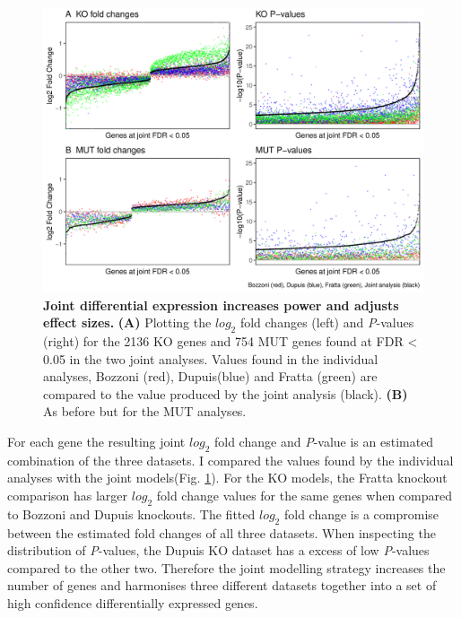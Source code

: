 \begin{figure}[ht!]
	\centering
	\includegraphics[width=\textwidth]{Figures/06_fus_meta/fitted_vs_individual_p_lfc.png}
	\caption[Joint differential expression increases power and adjusts effect sizes]{
		\textbf{Joint differential expression increases power and adjusts effect sizes.}
		\textbf{(A)} Plotting the $log_2$ fold changes (left) and \textit{P}-values (right) for the 2136 KO genes and 754 MUT genes found at FDR < 0.05 in the two joint analyses. Values found in the individual analyses, Bozzoni (red), Dupuis(blue) and Fratta (green) are compared to the value produced by the joint analysis (black).
		\textbf{(B)} As before but for the MUT analyses.
	}
	\label{fig:value_comparison}
\end{figure}

For each gene the resulting joint $log_2$ fold change and \textit{P}-value is an estimated combination of the three datasets.
I compared the values found by the individual analyses with the joint models(Fig. \ref{fig:value_comparison}).
For the KO models, the Fratta knockout comparison has larger $log_2$ fold change values for the same genes when compared to Bozzoni and Dupuis knockouts. 
The fitted $log_2$ fold change is a compromise between the estimated fold changes of all three datasets. 
When inspecting the distribution of \textit{P}-values, the Dupuis KO dataset has a excess of low \textit{P}-values compared to the other two.
Therefore the joint modelling strategy increases the number of genes and harmonises three different datasets together into a set of high confidence differentially expressed genes.

